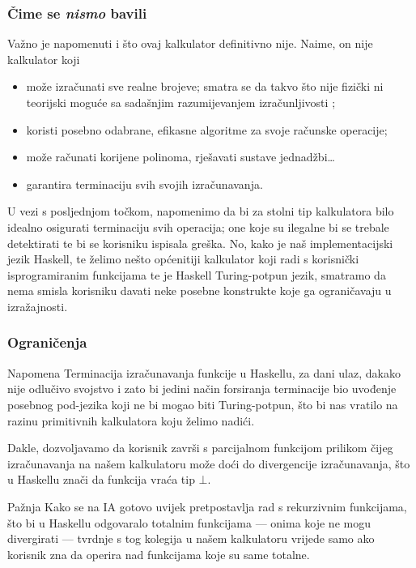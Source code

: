 \documentclass{beamer}
\begin{document}
\begin{frame}
    \frametitle{Čime se \emph{nismo} bavili}
    Važno je napomenuti i što ovaj kalkulator definitivno nije.
    Naime, on \alert{nije} kalkulator koji
    \begin{itemize}
        \pause
        \item može izračunati sve realne brojeve; smatra se da takvo
        što nije fizički ni teorijski moguće sa sadašnjim razumijevanjem 
        izračunljivosti \cite{weihrauch};
        \pause
        \item koristi posebno odabrane, efikasne algoritme za 
        svoje računske operacije;
        \pause
        \item može računati korijene polinoma, rješavati sustave jednadžbi\ldots 
        \pause
        \item garantira terminaciju svih svojih izračunavanja.
    \end{itemize}
    \pause
    U vezi s posljednjom točkom, napomenimo da bi za stolni
    tip kalkulatora bilo idealno osigurati terminaciju svih operacija;
    one koje su ilegalne bi se trebale detektirati te bi se korisniku
    ispisala greška. \pause No, kako je naš implementacijski jezik Haskell,
    te želimo nešto općenitiji kalkulator koji radi s korisnički
    isprogramiranim funkcijama te je Haskell Turing-potpun jezik,
    smatramo da nema smisla korisniku davati neke posebne konstrukte
    koje ga ograničavaju u izražajnosti. 
\end{frame}

\begin{frame}
\frametitle{Ograničenja}
\begin{block}{Napomena}
Terminacija izračunavanja
    funkcije u Haskellu, za dani ulaz, dakako nije odlučivo svojstvo
    i zato bi jedini način forsiranja terminacije bio uvođenje posebnog
    pod-jezika koji ne bi mogao biti Turing-potpun, što bi nas vratilo
    na razinu primitivnih kalkulatora koju želimo nadići.
\end{block}

\pause
Dakle, dozvoljavamo da korisnik završi s parcijalnom funkcijom prilikom
čijeg izračunavanja na našem kalkulatoru može doći do divergencije
izračunavanja, što u Haskellu znači da funkcija vraća tip $\bot$.

\pause
\begin{alertblock}{Pažnja}
Kako se na IA gotovo uvijek pretpostavlja rad
s \alert{rekurzivnim} funkcijama, što bi u Haskellu odgovaralo totalnim
funkcijama --- onima koje ne mogu divergirati --- tvrdnje s tog
kolegija u našem kalkulatoru vrijede samo ako korisnik
zna da operira nad funkcijama
koje su same totalne.
\end{alertblock}
\end{frame}
\end{document}
